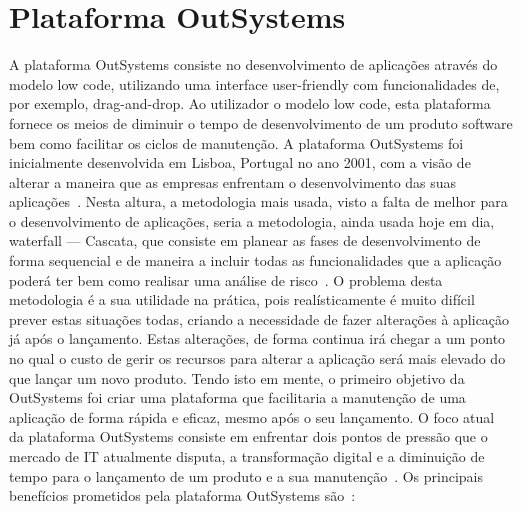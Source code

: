 \newpage

\section{Plataforma OutSystems}\label{sec:plataformaOutSystems}

A plataforma OutSystems consiste no desenvolvimento de aplicações através do modelo low code, utilizando uma interface user-friendly com funcionalidades de, por exemplo, drag-and-drop.
Ao utilizador o modelo low code, esta plataforma fornece os meios de diminuir o tempo de desenvolvimento de um produto software bem como facilitar os ciclos de manutenção.
A plataforma OutSystems foi inicialmente desenvolvida em Lisboa, Portugal no ano 2001, com a visão de alterar a maneira que as empresas enfrentam o desenvolvimento das suas aplicações~\cite{outsystemsbegin1}.
Nesta altura, a metodologia mais usada, visto a falta de melhor para o desenvolvimento de aplicações, seria a metodologia, ainda usada hoje em dia, waterfall --- Cascata, que consiste em planear as 
fases de desenvolvimento de forma sequencial e de maneira a incluir todas as funcionalidades que a aplicação poderá ter bem como realisar uma análise de risco~\cite{outsystemsbegin2}.
O problema desta metodologia é a sua utilidade na prática, pois realísticamente é muito difícil prever estas situações todas, criando a necessidade de fazer alterações
à aplicação já após o lançamento. Estas alterações, de forma continua irá chegar a um ponto no qual o custo de gerir os recursos para alterar a aplicação será mais elevado 
do que lançar um novo produto.
Tendo isto em mente, o primeiro objetivo da OutSystems foi criar uma plataforma que facilitaria a manutenção de uma aplicação de forma rápida e eficaz, mesmo após o seu lançamento.
O foco atual da plataforma OutSystems consiste em enfrentar dois pontos de pressão que o mercado de IT atualmente disputa, a transformação digital e a diminuição de tempo para o lançamento de um produto e a sua manutenção~\cite{outsystemsbegin3}.
Os principais benefícios prometidos pela plataforma OutSystems são~\cite{outsystemsbegin4}:
